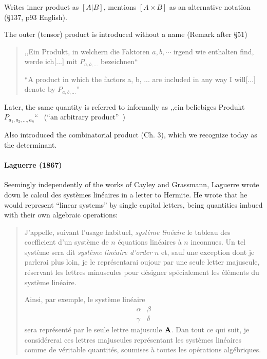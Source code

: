 Writes inner product as $[A | B]$, mentions $[A \times B]$ as an alternative notation (\S 137, p93 English).

The outer (tensor) product is introduced without a name (Remark after \S 51)

\begin{quote}
,,Ein Produkt, in welchern die Faktoren $a, b, \cdots$ irgend wie enthalten find, werde ich[...] mit $P_{a,b,...}$ bezeichnen`` \cite[p. 24, \S 43]{Grassmann1862}

``A product in which the factors a, b, ... are included in any way I will[...] denote by $P_{a,b,...}$''~\cite[p. 22, \S 43]{Grassmann2000}
\end{quote}

Later, the same quantity is referred to informally as
,,ein beliebiges Produkt $P_{a_1, a_2, ..., a_n}$``~\cite[\S 353]{Grassmann1862} (``an arbitrary product''~\cite[p. 196, \S 353]{Grassmann2000})

Also introduced the combinatorial product (Ch. 3), which we recognize today as the determinant.


\paragraph{Laguerre (1867)~\cite{Laguerre1867}}

Seemingly independently of the works of Cayley and Grassmann, Laguerre wrote down
le calcul des systèmes linéaires in a letter to Hermite. He wrote that he would
represent ``linear systems'' by single capital letters, being quantities imbued
with their own algebraic operations:

\begin{quote}
    J'appelle, suivant l'usage habituel, \textit{système linéaire} le tableau
    des coefficient d'un système de $n$ équations linéaires à $n$ inconnues.
    Un tel système sera dit \textit{système linéaire d'order} $n$ et,
    sauf une exception dont je parlerai plus loin, je le représentarai
    oujour par une seule letter majuscule, réservant les lettres
    minuscules pour désigner spécialement les éléments du système linéaire.

    Ainsi, par exemple, le système linéaire
    \[
        \begin{matrix}\alpha & \beta \\ \gamma & \delta \end{matrix}
    \]
    sera représenté par le seule lettre majuscule $\bf A$. Dan tout ce qui
    suit, je considérerai ces lettres majuscules représentant les systèmes
    linéaires comme de véritable quantités, soumises à toutes
    les opérations algébriques.
\end{quote}

